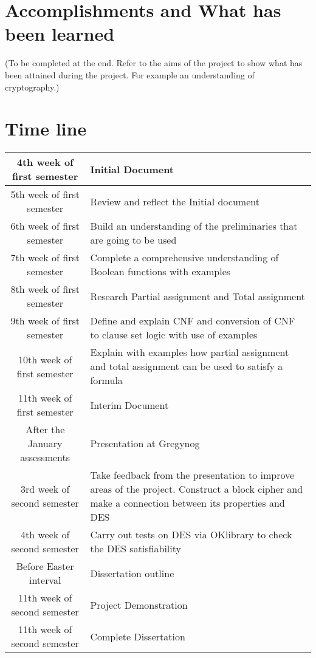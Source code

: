 \documentclass[11pt,a4paper]{report}
\begin{document}
\section{Accomplishments and What has been learned}
(To be completed at the end. Refer to the aims of the project to show what has been attained during the project. For example an understanding of cryptography.)

\section{Time line}
\begin{center}
\begin{tabular}{|c|p{5cm}|}
\hline
4th week of first semester & Initial Document \\\hline
5th week of first semester & Review and reflect the Initial document\\ \hline
6th week of first semester & Build an understanding of the preliminaries that are going to be used\\ \hline
7th week of first semester & Complete a comprehensive understanding of Boolean functions with examples\\ \hline
8th week of first semester & Research Partial assignment and Total assignment \\ \hline
9th week of first semester & Define and explain CNF and conversion of CNF to clause set logic with use of examples \\ \hline
10th week of first semester & Explain with examples how partial assignment and total assignment can be used to satisfy a formula\\\hline
11th week of first semester & Interim Document\\ \hline
After the January assessments & Presentation at Gregynog\\ \hline
3rd week of second semester & Take feedback from the presentation to improve areas of the project. Construct a block cipher and make a connection between its properties and DES\\ \hline
4th week of second semester & Carry out tests on DES via OKlibrary to check the DES satisfiability\\ \hline
Before Easter interval & Dissertation outline\\ \hline
11th week of second semester & Project Demonstration\\ \hline
11th week of second semester & Complete Dissertation\\ \hline
\hline
\end{tabular}
\end{center}
\end{document}
